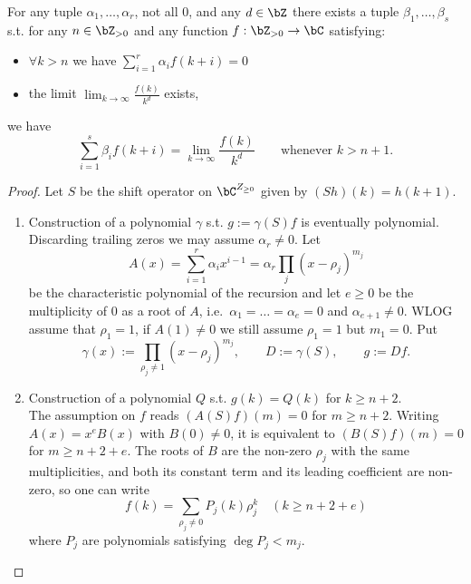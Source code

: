 \documentclass[12pt,a4paper]{amsart}%
\newcommand{\RamiA}[1]{{{#1}}}
\newcommand{\DimaA}[1]{{{#1}}}
\begin{document}
\begin{lemma}\label{lem:rec}
    For any tuple $\alpha_1,\dots,\alpha_r$, not all $0$,  and any $d\in \Z$ there exists a tuple $\beta_1,\dots,\beta_s$ s.t. for any $n\in \Z_{>0}$ and any function $f:\Z_{>0}\to \C$ satisfying:
    \begin{itemize}
        \item $\forall k>n$ we have $\sum_{i=1}^r  \alpha_i f(k+i)=0$
        \item the limit $\lim_{k\to \infty} \frac{f(k)}{k^d}$  exists,
    \end{itemize}
    we have
    $$\sum_{i=1}^s  \beta_i f(k+i)=\lim_{k\to \infty} \frac{f(k)}{k^d}\qquad\text{whenever }k>n+1.$$
\end{lemma}

\begin{proof}
\RamiA{Let $S$
be the shift \RamiA{operator on $\C^{Z_{\geq 0}}$ given by} $(Sh)(k)=h(k+1).$}
\begin{enumerate}[Step 1.]
    \item \RamiA{Construction of a polynomial $\gamma$ s.t. $g:=\gamma(S)f$ is  eventually polynomial.}\\
    Discarding trailing zeros we may assume $\alpha_r\neq0$\DimaA{.}
    Let    $$A(x)=\sum_{i=1}^r\alpha_ix^{i-1}=\alpha_r\prod_j(x-\rho_j)^{m_j}$$
    be the characteristic polynomial of the recursion and let $e\geq0$ be the multiplicity of $0$ as a root of $A$, i.e.\ $\alpha_1=\dots=\alpha_{e}=0$ and $\alpha_{e+1}\neq0$. 
    \RamiA{WLOG assume that $\rho_1=1$, if $A(1)\neq 0$ we still assume $\rho_1=1$ but $m_1=0$.}
    \RamiA{Put
    $$\gamma(x):=\prod_{\rho_j\neq1}(x-\rho_j)^{m_j},\qquad D:=\gamma(S),\qquad g:=Df .$$}    
    \item \RamiA{Construction of a polynomial $Q$ s.t. $g(k)=Q(k)$ for $k\geq n+2$.}\\    
The assumption on $f$ reads $(A(S)f)(m)=0$ for $m\geq n+2$. Writing $A(x)=x^{e}B(x)$ with $B(0)\neq0$, it is equivalent to $(B(S)f)(m)=0$ for $m\geq n+2+e$. The roots of $B$ are the non-zero $\rho_j$ with the same multiplicities, and both its constant term and its leading coefficient are non-zero, so \RamiA{one can write}
    \begin{equation}\label{lem:rec:1} f(k)=\sum_{\rho_j\neq0}P_j(k)\rho_j^k\quad (k\geq n+2+e)
    \end{equation}
    \RamiA{where $P_j$ are polynomials satisfying $\deg P_j<m_j$.}



\end{enumerate}
\end{proof}
\end{document}
